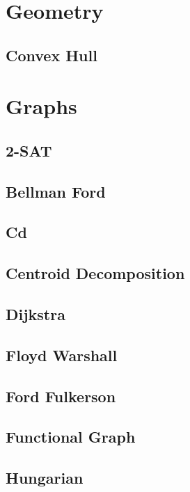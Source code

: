 \documentclass[a4paper,10pt]{article}
\begin{document}
\section{Geometry}
\subsection{Convex Hull}

\section{Graphs}
\subsection{2-SAT}

\subsection{Bellman Ford}

\subsection{Cd}

\subsection{Centroid Decomposition}

\subsection{Dijkstra}

\subsection{Floyd Warshall}

\subsection{Ford Fulkerson}

\subsection{Functional Graph}

\subsection{Hungarian}

\end{document}
